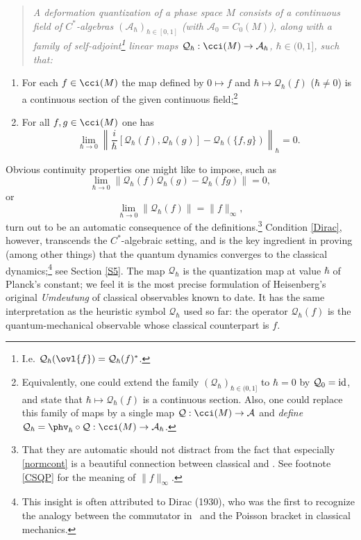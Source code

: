 \documentclass[12pt,titlepage]{article}
\newcommand{\beq}{\begin{equation}}
\newcommand{\eeq}{\end{equation}}
\newcommand{\ca}{$C^*$-algebra} \newcommand{\jba}{JB-algebra}
\newcommand{\id}{\mbox{\rm id}}
\newcommand{\raw}{\rightarrow} \newcommand{\rat}{\mapsto}
\newcommand{\qh}{q_{\hbar}} \newcommand{\sgh}{\sigma_{\hbar}}
\newcommand{\er}{\eqref}
\newcommand{\CA}{{\mathcal A}} \newcommand{\CB}{{\mathcal B}}
\newcommand{\CQ}{{\mathcal Q}} \newcommand{\CR}{{\mathcal R}}
\renewcommand{\qh}{\CQ_{\hbar}}
\begin{document}
\begin{quote}
{\it A deformation quantization of a phase space $M$ consists of a continuous field of \ca s $(\CA_{\hbar})_{\hbar\in [0,1]}$ (with $\CA_0=C_0(M)$), along with a family of self-adjoint\footnote{I.e. $\qh(\ovl{f})=\qh(f)^*$.}  linear maps $\qh:\cci(M)\raw\CA_{\hbar}$, $\hbar\in(0,1]$, such that:}\end{quote}
\begin{enumerate}
\item For each $f\in\cci(M)$ the map defined by $0\mapsto f$ and
$\hbar\mapsto\qh(f)$ ($\hbar\neq 0$) is a continuous section of the given continuous field;\footnote{Equivalently, one could extend the family $(\qh)_{\hbar\in(0,1]}$ to $\hbar=0$ by $\CQ_0=\id$, and state that $\hbar\mapsto\qh(f)$ is a continuous section. Also, one could replace this family of maps by a single map $\CQ:\cci(M)\raw\CA$ and {\it define}
$\qh=\phv_{\hbar}\circ \CQ:\cci(M)\raw \CA_{\hbar}$.}
\item 
 For all $f,g\in \cci(M)$ one has 
\begin{equation}
\lim_{\hbar\rightarrow 0} 
\left\|\frac{i}{\hbar}[\CQ_{\hbar}(f),\CQ_{\hbar}(g)]-\CQ_{\hbar}(\{f,g\})\right\|_{\hbar} =0. \label{Dirac}
\end{equation}\end{enumerate}

Obvious continuity properties one might like to impose, such as \beq\lim_{\hbar\rightarrow 0} \|\qh(f)\qh(g)-\qh(fg)\|=0,\eeq or \beq\lim_{\hbar\rightarrow 0} \|\qh(f)\|=\| f\|_{\infty},\label{normcont} \eeq
 turn out to be an automatic consequence of the definitions.\footnote{That they are automatic should not distract from the fact that especially \er{normcont} is a beautiful connection between classical and \qm.
 See footnote \ref{CSQP} for the meaning of $\| f\|_{\infty}$.} Condition \er{Dirac}, however, transcends the \ca ic setting, and is the key ingredient in proving (among other things) that the quantum dynamics converges to the classical dynamics;\footnote{This insight is often attributed to Dirac (1930), who was the first to recognize the analogy between the commutator in \qm\ and the Poisson bracket in classical mechanics.}
  see Section \ref{S5}. The map $\qh$ is the quantization map at value $\hbar$ of Planck's constant; we feel it is the most precise formulation of Heisenberg's original {\it Umdeutung} of classical observables known to date. It has the same interpretation as the heuristic symbol $\qh$ used so far: the operator $\qh(f)$ is the quantum-mechanical observable whose classical counterpart is $f$. 
 
\end{document}
